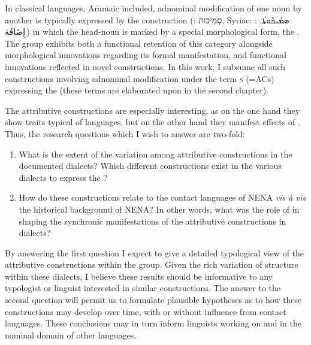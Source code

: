 In classical  languages, Aramaic included, adnominal modification of one noun by another is typically expressed by the  construction (:  \texthebrew{סְמִיכוּת}, Syriac:  \textsyriac{ܣܡܺܝܟܽܘܬܳܐ}, :  \textarabic{إِضَافَة}\,) in which the head-noun is marked by a special morphological form, the . The  group exhibits both a functional retention of this category alongside morphological innovations regarding its formal manifestation, and functional innovations reflected in novel constructions. In this work, I subsume all such constructions involving adnominal modification under the term \textsc{s} (=ACs) expressing the  (these terms are elaborated upon in the second chapter). 

The  attributive constructions are  especially interesting,  as on the one hand they show traits typical of  languages, but on the other hand they manifest effects of . Thus, the research questions which I wish to answer are two-fold:

\begin{enumerate}

\item What is the extent of the variation among attributive constructions in the documented  dialects? Which different constructions exist in the various dialects to express the ?

\item How do these constructions relate to the contact languages of {NENA} \textit{vis à vis} the historical background of {NENA}? In other words, what was the role of  in shaping the synchronic manifestations of the attributive constructions in  dialects?

\end{enumerate}

By answering the first question I expect to give a detailed typological view of the attributive constructions within the  group. Given the rich variation of structure within these dialects, I believe these results should be informative to any typologist or linguist interested in similar constructions. The answer to the second question will permit us to formulate plausible hypotheses as to how these constructions may develop over time, with or without influence from contact languages. These conclusions may in turn inform linguists working on  and  in the nominal domain of other languages.

